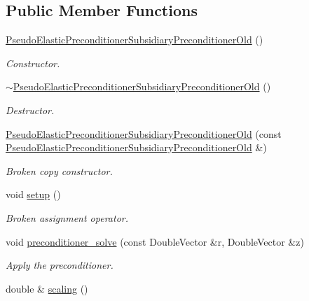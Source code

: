 \subsection*{Public Member Functions}
\begin{DoxyCompactItemize}
\item 
\hyperlink{classoomph_1_1PseudoElasticPreconditionerSubsidiaryPreconditionerOld_a674640dd0de0b3a40857c01e8b868928}{Pseudo\+Elastic\+Preconditioner\+Subsidiary\+Preconditioner\+Old} ()
\begin{DoxyCompactList}\small\item\em Constructor. \end{DoxyCompactList}\item 
\hyperlink{classoomph_1_1PseudoElasticPreconditionerSubsidiaryPreconditionerOld_a231e24badc0c56a577af50891100ecb7}{$\sim$\+Pseudo\+Elastic\+Preconditioner\+Subsidiary\+Preconditioner\+Old} ()
\begin{DoxyCompactList}\small\item\em Destructor. \end{DoxyCompactList}\item 
\hyperlink{classoomph_1_1PseudoElasticPreconditionerSubsidiaryPreconditionerOld_a58a3b8721c6c171175b520315782498b}{Pseudo\+Elastic\+Preconditioner\+Subsidiary\+Preconditioner\+Old} (const \hyperlink{classoomph_1_1PseudoElasticPreconditionerSubsidiaryPreconditionerOld}{Pseudo\+Elastic\+Preconditioner\+Subsidiary\+Preconditioner\+Old} \&)
\begin{DoxyCompactList}\small\item\em Broken copy constructor. \end{DoxyCompactList}\item 
void \hyperlink{classoomph_1_1PseudoElasticPreconditionerSubsidiaryPreconditionerOld_a532201f17edc43b3b475fff2d2744b8b}{setup} ()
\begin{DoxyCompactList}\small\item\em Broken assignment operator. \end{DoxyCompactList}\item 
void \hyperlink{classoomph_1_1PseudoElasticPreconditionerSubsidiaryPreconditionerOld_a01d70c9e3454b52c86f4439d29fd4b22}{preconditioner\+\_\+solve} (const Double\+Vector \&r, Double\+Vector \&z)
\begin{DoxyCompactList}\small\item\em Apply the preconditioner. \end{DoxyCompactList}\item 
double \& \hyperlink{classoomph_1_1PseudoElasticPreconditionerSubsidiaryPreconditionerOld_a38a9cf93e354ea1fbb76f8d8fa1df0ab}{scaling} ()

\end{DoxyCompactItemize}
